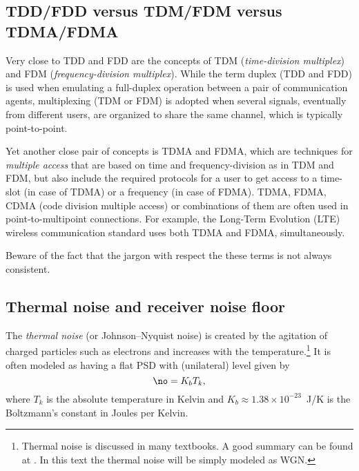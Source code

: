 \subsection{TDD/FDD versus TDM/FDM versus TDMA/FDMA}

Very close to TDD and FDD are the concepts of TDM (\emph{time-division multiplex}) and FDM (\emph{frequency-division multiplex}). While the term duplex (TDD and FDD) is used when emulating a full-duplex operation between a pair of communication agents, multiplexing (TDM or FDM) is adopted when several signals, eventually from different users, are organized to share the same channel, which is typically point-to-point. 

Yet another close pair of concepts is TDMA and FDMA, which are techniques for \emph{multiple access}
 that are based on time and frequency-division as in TDM and FDM, but also include the required protocols for a user to get access to a time-slot (in case of TDMA) or a frequency (in case of FDMA). 
TDMA, FDMA, CDMA (code division multiple access) or combinations of them are often used in point-to-multipoint connections. For example, the Long-Term Evolution (LTE) wireless communication standard uses both TDMA and FDMA, simultaneously.

Beware of the fact that the jargon with respect the these terms is not always consistent.




\subsection{Thermal noise and receiver noise floor}
\label{sec:thermalNoise}

The \emph{thermal noise} (or Johnson–Nyquist noise) 
is created by the agitation of charged particles such as electrons and increases
with the temperature.\footnote{Thermal noise is discussed in many textbooks. A good summary can be found at . In this text the thermal noise will be simply modeled as WGN.} It 
is often modeled as having a flat PSD with (unilateral) level given by
\begin{equation}
\no = K_b T_k,
\label{eq:psdThermal}
\end{equation}
where $T_k$ is the absolute temperature in Kelvin and  $K_b \approx 1.38 \times 10^{-23}$~J/K is the  Boltzmann's constant in Joules per Kelvin.

